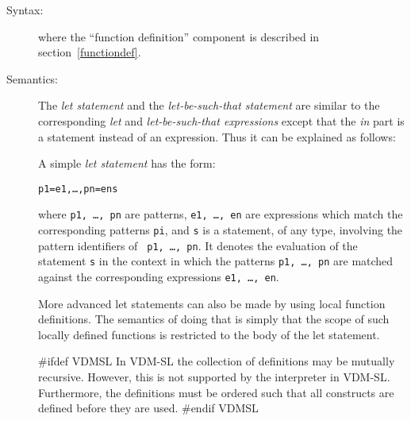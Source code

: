 \documentclass[\pformat,12pt]{article}
\begin{document}
\begin{description}
\item[Syntax:]





  where the ``function definition'' component is described in
  section~\ref{functiondef}.

\item[Semantics:] The {\it let statement} and the {\it let-be-such-that
    statement} are similar to the corresponding {\it let} and {\it
    let-be-such-that expressions} except that the {\it in} part is a
  statement instead of an expression. Thus it can be explained as follows:

  A simple {\it let statement} has the form:
  \begin{alltt}
     p1 = e1, \ldots, pn = en  s
  \end{alltt}
  where {\tt p1, \ldots, pn} are patterns, {\tt e1, \ldots, en} are
  expressions which match the corresponding patterns {\tt pi}, and {\tt s}
  is a statement, of any type, involving the pattern identifiers of {\tt
    p1, \ldots, pn}. It denotes the evaluation of the statement {\tt s} in
  the context in which the patterns {\tt p1, \ldots, pn} are matched
  against the corresponding expressions {\tt e1, \ldots, en}.

  More advanced let statements can also be made by using local function
  definitions. The semantics of doing that is simply that the scope of such
  locally defined functions is restricted to the body of the let statement.

#ifdef VDMSL
  In VDM-SL the collection of definitions may be mutually recursive.
  However, this is not supported by the interpreter in  VDM-SL.
  Furthermore, the definitions must be ordered such that
  all constructs are defined before they are used.
#endif VDMSL


\end{description}
\end{document}
